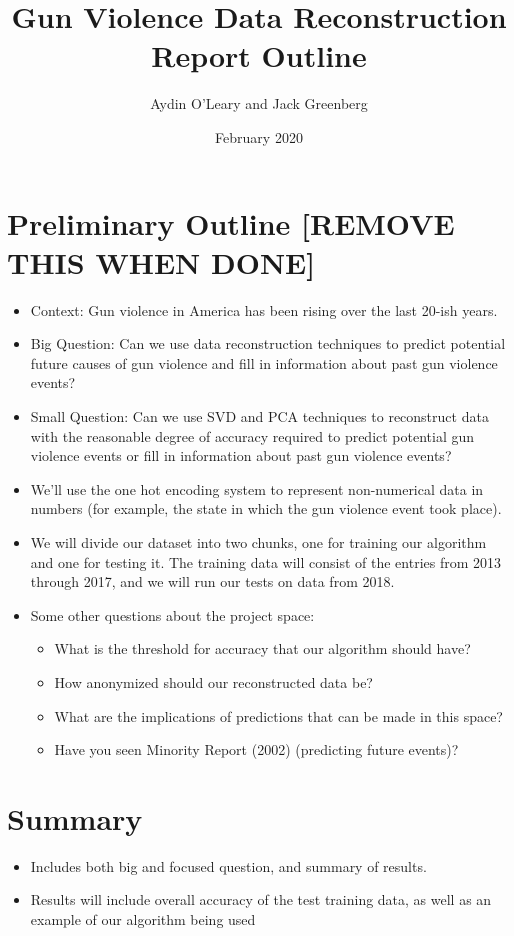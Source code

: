 \documentclass{article}
\title{Gun Violence Data Reconstruction Report Outline}
\author{Aydin O'Leary and Jack Greenberg }
\date{February 2020}
\begin{document}
\maketitle

\section*{Preliminary Outline [REMOVE THIS WHEN DONE]}

\begin{itemize}
    \item Context: Gun violence in America has been rising over the last 20-ish years. \cite{website:cdc-data}
    \item Big Question: Can we use data reconstruction techniques to predict potential future causes of gun violence and fill in information about past gun violence events?
    \item Small Question: Can we use SVD and PCA techniques to reconstruct data with the reasonable degree of accuracy required to predict potential gun violence events or fill in information about past gun violence events?
    \item We'll use the one hot encoding system \cite{website:wikipedia_one-hot} to represent non-numerical data in numbers (for example, the state in which the gun violence event took place).
    \item We will divide our dataset into two chunks, one for training our algorithm and one for testing it. The training data will consist of the entries from 2013 through 2017, and we will run our tests on data from 2018.
    \item Some other questions about the project space: \begin{itemize}
        \item What is the threshold for accuracy that our algorithm should have?
        \item How anonymized should our reconstructed data be?
        \item What are the implications of predictions that can be made in this space?
        \item Have you seen Minority Report (2002) (predicting future events)?
    \end{itemize}
\end{itemize}

\section*{Summary}
    \begin{itemize}
        \item Includes both big and focused question, and summary of results.
        \item Results will include overall accuracy of the test training data, as well as an example of our algorithm being used
    \end{itemize}
\end{document}
